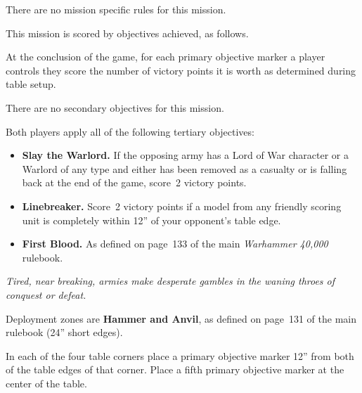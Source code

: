 
There are no mission specific rules for this mission.



This mission is scored by objectives achieved, as follows.

 At the conclusion of the game,
for each primary objective marker a player controls they score the
number of victory points it is worth as determined during table setup.


There are no secondary objectives for this mission.

  Both players apply all of
the following tertiary objectives:

\begin{itemize}
\item \textbf{Slay the Warlord.}  If the opposing army has a Lord of
  War character or a Warlord of any type and either has been removed
  as a casualty or is falling back at the end of the game, score~2
  victory points.

\item \textbf{Linebreaker.}  Score~2 victory points if a model from
  any friendly scoring unit is completely within 12'' of your
  opponent's table edge.

\item \textbf{First Blood.}  As defined on page~133 of the main
  \emph{Warhammer 40,000} rulebook.
\end{itemize}



\centerline{\emph{Tired, near breaking, armies make desperate gambles
    in the waning throes of conquest or defeat.}}


Deployment zones are \textbf{Hammer and Anvil}, as defined on page~131
of the main rulebook (24'' short edges).

\bigskip%
In each of the four table corners place a primary objective marker
12'' from both of the table edges of that corner.  Place a fifth
primary objective marker at the center of the table.


